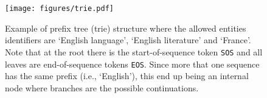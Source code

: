 \documentclass{article} \usepackage{main,times}
\begin{document}
 \begin{figure}[!ht]
    \centering
    \texttt{[image: figures/trie.pdf]}
    \caption{Example of prefix tree (trie) structure where the allowed entities identifiers are `English language', `English literature' and `France'. Note that at the root there is the start-of-sequence token \texttt{SOS} and all leaves are end-of-sequence tokens \texttt{EOS}. Since more that one sequence has the same prefix (i.e., `English'), this end up being an internal node where branches are the possible continuations.}
    \label{fig:trie}
\end{figure}
  
\end{document}
